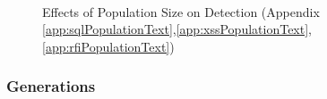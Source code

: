 \newpage
\begin{figure}[hb]
	\centering
	\\
	\caption{Effects of Population Size on Detection (Appendix \ref{app:sqlPopulationText},\ref{app:xssPopulationText},\ref{app:rfiPopulationText})}
	\label{fig:resPopSize}
\end{figure}

\newpage
\subsubsection{Generations} \label{sec:resGeneration}

